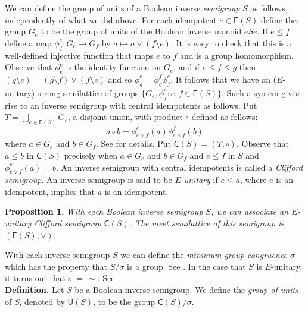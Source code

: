 \documentclass[a4paper]{amsart}
\newtheorem{proposition}[theorem]{Proposition}
\begin{document}
We can define the group of units of a Boolean inverse {\em semigroup} $S$ as follows, independently of what we did above.
For each idempotent $e \in \mathsf{E}(S)$ define the group $G_{e}$ to be the group
of units of the Boolean inverse monoid $eSe$.
If $e \leq f$ define a map $\phi^{e}_{f} \colon G_{e} \rightarrow G_{f}$ by $a \mapsto a \vee (f \setminus e)$.
It is easy to check that this is a well-defined injective function that maps $e$ to $f$
and is a group homomorphism.
Observe that $\phi^{e}_{e}$ is the identity function on $G_{e}$,
and if $e \leq f \leq g$ then $(g \setminus e) = (g \setminus f) \vee (f \setminus e)$ and so
$\phi^{e}_{g} = \phi^{f}_{g}\phi^{e}_{f}$.
It follows that we have an ($E$-unitary) strong semilattice of groups $\{G_{e},\phi^{e}_{f} \colon e,f \in \mathsf{E}(S)\}$.
Such a system gives rise to an inverse semigroup with central idempotents as follows.
Put $T = \bigcup_{e \in \mathsf{E}(S)}G_{e}$, a disjoint union, with product $\circ$ defined as follows:
$$a \circ b = \phi^{e}_{e \vee f}(a) \phi^{f}_{e \wedge f}(b)$$
where $a \in G_{e}$ and $b \in G_{f}$.
See \cite[Section 5.2, page 144]{Lawson1998} for details.
Put $\mathsf{C}(S) = (T,\circ)$.
Observe that $a \leq b$ in $\mathsf{C}(S)$ precisely when $a \in G_{e}$ and $b \in G_{f}$
and $e \leq f$ in $S$ and $\phi^{e}_{e \vee f}(a) = b$. 
An inverse semigroup with central idempotents is called a {\em Clifford semigroup}.
An inverse semigroup is said to be {\em $E$-unitary} if $e \leq a$, where $e$ is an idempotent,
implies that $a$ is an idempotent.

\begin{proposition}\label{prop:clifford} With each Boolean inverse semigroup $S$, 
we can associate an $E$-unitary Clifford semigroup
$\mathsf{C}(S)$. 
The meet semilattice of this semigroup is $(\mathsf{E}(S),\vee)$.
\end{proposition}

With each inverse semigroup $S$ we can define the {\em minimum group congruence $\sigma$} which has the property that
$S/\sigma$ is a group. See \cite[Section 2.4]{Lawson1998}.
In the case that $S$ is $E$-unitary, it turns out that $\sigma \, = \, \sim$.
See \cite[Theorem 2.4.6]{Lawson1998}.\\

\noindent
{\bf Definition.} Let $S$ be a Boolean inverse semigroup.
We define the {\em group of units} of $S$, denoted by $\mathsf{U}(S)$,
to be the group $\mathsf{C}(S)/\sigma$.\\
\end{document}
